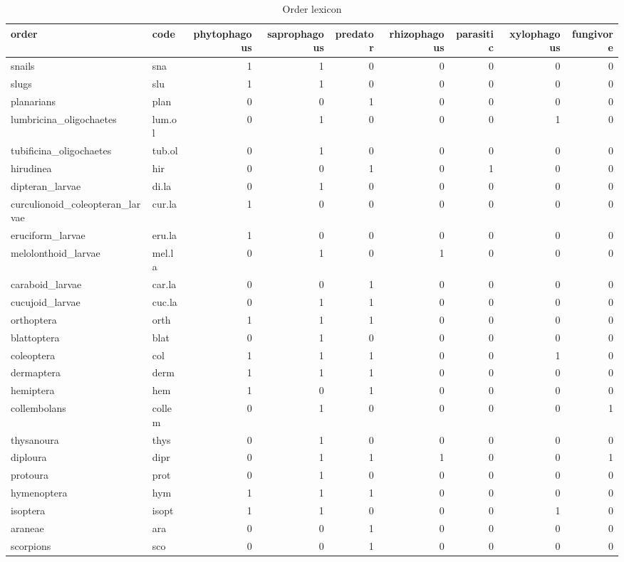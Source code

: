 \documentclass[fleqn,10pt]{ArtEcoFoG} %
\begin{document}
\begin{longtable}[t]{llrrrrrrr}
\caption{\label{tab:kable}Order lexicon}\\
\toprule
order & code & phytophagous & saprophagous & predator & rhizophagous & parasitic & xylophagous & fungivore\\
\midrule
snails & sna & 1 & 1 & 0 & 0 & 0 & 0 & 0\\
slugs & slu & 1 & 1 & 0 & 0 & 0 & 0 & 0\\
planarians & plan & 0 & 0 & 1 & 0 & 0 & 0 & 0\\
lumbricina\_oligochaetes & lum.ol & 0 & 1 & 0 & 0 & 0 & 1 & 0\\
tubificina\_oligochaetes & tub.ol & 0 & 1 & 0 & 0 & 0 & 0 & 0\\
\addlinespace
hirudinea & hir & 0 & 0 & 1 & 0 & 1 & 0 & 0\\
dipteran\_larvae & di.la & 0 & 1 & 0 & 0 & 0 & 0 & 0\\
curculionoid\_coleopteran\_larvae & cur.la & 1 & 0 & 0 & 0 & 0 & 0 & 0\\
eruciform\_larvae & eru.la & 1 & 0 & 0 & 0 & 0 & 0 & 0\\
melolonthoid\_larvae & mel.la & 0 & 1 & 0 & 1 & 0 & 0 & 0\\
\addlinespace
caraboid\_larvae & car.la & 0 & 0 & 1 & 0 & 0 & 0 & 0\\
cucujoid\_larvae & cuc.la & 0 & 1 & 1 & 0 & 0 & 0 & 0\\
orthoptera & orth & 1 & 1 & 1 & 0 & 0 & 0 & 0\\
blattoptera & blat & 0 & 1 & 0 & 0 & 0 & 0 & 0\\
coleoptera & col & 1 & 1 & 1 & 0 & 0 & 1 & 0\\
\addlinespace
dermaptera & derm & 1 & 1 & 1 & 0 & 0 & 0 & 0\\
hemiptera & hem & 1 & 0 & 1 & 0 & 0 & 0 & 0\\
collembolans & collem & 0 & 1 & 0 & 0 & 0 & 0 & 1\\
thysanoura & thys & 0 & 1 & 0 & 0 & 0 & 0 & 0\\
diploura & dipr & 0 & 1 & 1 & 1 & 0 & 0 & 1\\
\addlinespace
protoura & prot & 0 & 1 & 0 & 0 & 0 & 0 & 0\\
hymenoptera & hym & 1 & 1 & 1 & 0 & 0 & 0 & 0\\
isoptera & isopt & 1 & 1 & 0 & 0 & 0 & 1 & 0\\
araneae & ara & 0 & 0 & 1 & 0 & 0 & 0 & 0\\
scorpions & sco & 0 & 0 & 1 & 0 & 0 & 0 & 0\\

\end{longtable}
\end{document}
